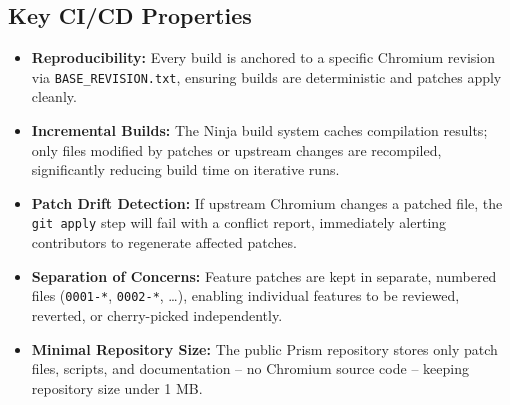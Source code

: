 \subsection{Key CI/CD Properties}
\begin{itemize}[leftmargin=*]
    \item \textbf{Reproducibility:} Every build is anchored to a specific Chromium revision via \texttt{BASE\_REVISION.txt}, ensuring builds are deterministic and patches apply cleanly.
    \item \textbf{Incremental Builds:} The Ninja build system caches compilation results; only files modified by patches or upstream changes are recompiled, significantly reducing build time on iterative runs.
    \item \textbf{Patch Drift Detection:} If upstream Chromium changes a patched file, the \texttt{git apply} step will fail with a conflict report, immediately alerting contributors to regenerate affected patches.
    \item \textbf{Separation of Concerns:} Feature patches are kept in separate, numbered files (\texttt{0001-*}, \texttt{0002-*}, \ldots), enabling individual features to be reviewed, reverted, or cherry-picked independently.
    \item \textbf{Minimal Repository Size:} The public Prism repository stores only patch files, scripts, and documentation -- no Chromium source code -- keeping repository size under 1 MB.
\end{itemize}
